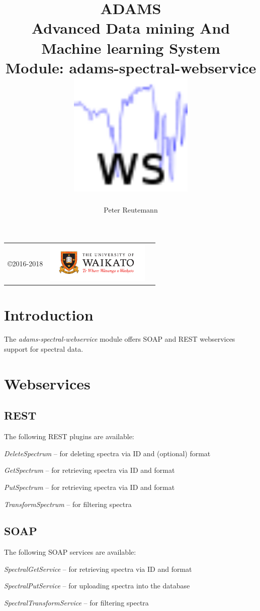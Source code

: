 \documentclass[a4paper]{book}
\title{
  \textbf{ADAMS} \\
  {\Large \textbf{A}dvanced \textbf{D}ata mining \textbf{A}nd \textbf{M}achine
  learning \textbf{S}ystem} \\
  {\Large Module: adams-spectral-webservice} \\
  \vspace{1cm}
  \includegraphics[width=6cm]{images/spectral-webservice-module.png} \\
}
\author{
  Peter Reutemann
}
\begin{document}
\begin{titlepage}
\maketitle

\thispagestyle{empty}
\center
\begin{table}[b]
	\begin{tabular}{c l l}
		\parbox[c][2cm]{2cm}{\copyright 2016-2018} &
		\parbox[c][2cm]{5cm}{\includegraphics[width=5cm]{images/coat_of_arms.pdf}} \\
	\end{tabular}
\end{table}

\end{titlepage}

\tableofcontents

\chapter{Introduction}
The \textit{adams-spectral-webservice} module offers SOAP and REST webservices
support for spectral data.

\chapter{Webservices}
\section{REST}
The following REST plugins are available:
\begin{tight_itemize}
  \item \textit{DeleteSpectrum} -- for deleting spectra via ID and (optional) format
  \item \textit{GetSpectrum} -- for retrieving spectra via ID and format
  \item \textit{PutSpectrum} -- for retrieving spectra via ID and format
  \item \textit{TransformSpectrum} -- for filtering spectra
\end{tight_itemize}

\section{SOAP}
The following SOAP services are available:
\begin{tight_itemize}
  \item \textit{SpectralGetService} -- for retrieving spectra via ID and format
  \item \textit{SpectralPutService} -- for uploading spectra into the database
  \item \textit{SpectralTransformService} -- for filtering spectra
\end{tight_itemize}



\end{document}
